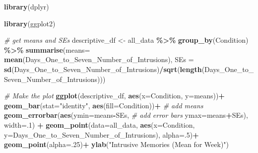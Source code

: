 \documentclass[
]{book}
\newenvironment{Shaded}{\begin{snugshade}}{\end{snugshade}}
\newcommand{\AttributeTok}[1]{\textcolor[rgb]{0.13,0.29,0.53}{#1}}
\newcommand{\CommentTok}[1]{\textcolor[rgb]{0.56,0.35,0.01}{\textit{#1}}}
\newcommand{\DecValTok}[1]{\textcolor[rgb]{0.00,0.00,0.81}{#1}}
\newcommand{\FunctionTok}[1]{\textcolor[rgb]{0.13,0.29,0.53}{\textbf{#1}}}
\newcommand{\NormalTok}[1]{#1}
\newcommand{\OtherTok}[1]{\textcolor[rgb]{0.56,0.35,0.01}{#1}}
\newcommand{\SpecialCharTok}[1]{\textcolor[rgb]{0.81,0.36,0.00}{\textbf{#1}}}
\newcommand{\StringTok}[1]{\textcolor[rgb]{0.31,0.60,0.02}{#1}}
\begin{document}
\begin{Shaded}
\begin{Highlighting}[]
\FunctionTok{library}\NormalTok{(dplyr)}

\FunctionTok{library}\NormalTok{(ggplot2)}

\CommentTok{\# get means and SEs}
\NormalTok{descriptive\_df }\OtherTok{\textless{}{-}}\NormalTok{ all\_data }\SpecialCharTok{\%\textgreater{}\%} 
                    \FunctionTok{group\_by}\NormalTok{(Condition) }\SpecialCharTok{\%\textgreater{}\%} 
                    \FunctionTok{summarise}\NormalTok{(}\AttributeTok{means=} \FunctionTok{mean}\NormalTok{(Days\_One\_to\_Seven\_Number\_of\_Intrusions),}
                              \AttributeTok{SEs =} \FunctionTok{sd}\NormalTok{(Days\_One\_to\_Seven\_Number\_of\_Intrusions)}\SpecialCharTok{/}\FunctionTok{sqrt}\NormalTok{(}\FunctionTok{length}\NormalTok{(Days\_One\_to\_Seven\_Number\_of\_Intrusions)))}

\CommentTok{\# Make the plot}
\FunctionTok{ggplot}\NormalTok{(descriptive\_df, }\FunctionTok{aes}\NormalTok{(}\AttributeTok{x=}\NormalTok{Condition, }\AttributeTok{y=}\NormalTok{means))}\SpecialCharTok{+} 
  \FunctionTok{geom\_bar}\NormalTok{(}\AttributeTok{stat=}\StringTok{"identity"}\NormalTok{, }\FunctionTok{aes}\NormalTok{(}\AttributeTok{fill=}\NormalTok{Condition))}\SpecialCharTok{+} \CommentTok{\# add means}
  \FunctionTok{geom\_errorbar}\NormalTok{(}\FunctionTok{aes}\NormalTok{(}\AttributeTok{ymin=}\NormalTok{means}\SpecialCharTok{{-}}\NormalTok{SEs,               }\CommentTok{\# add error bars}
                    \AttributeTok{ymax=}\NormalTok{means}\SpecialCharTok{+}\NormalTok{SEs), }\AttributeTok{width=}\NormalTok{.}\DecValTok{1}\NormalTok{) }\SpecialCharTok{+}
  \FunctionTok{geom\_point}\NormalTok{(}\AttributeTok{data=}\NormalTok{all\_data, }\FunctionTok{aes}\NormalTok{(}\AttributeTok{x=}\NormalTok{Condition, }\AttributeTok{y=}\NormalTok{Days\_One\_to\_Seven\_Number\_of\_Intrusions), }\AttributeTok{alpha=}\NormalTok{.}\DecValTok{5}\NormalTok{)}\SpecialCharTok{+}
  \FunctionTok{geom\_point}\NormalTok{(}\AttributeTok{alpha=}\NormalTok{.}\DecValTok{25}\NormalTok{)}\SpecialCharTok{+}
  \FunctionTok{ylab}\NormalTok{(}\StringTok{"Intrusive Memories (Mean for Week)"}\NormalTok{)}
\end{Highlighting}
\end{Shaded}
\end{document}

